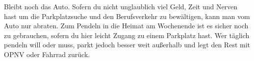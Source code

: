 
Bleibt noch das Auto. Sofern du nicht unglaublich viel Geld, Zeit und Nerven hast um die Parkplatzsuche und den Berufsverkehr zu bewältigen, kann man vom Auto nur abraten. Zum Pendeln in die Heimat am Wochenende ist es sicher noch zu gebrauchen, sofern du hier leicht Zugang zu einem Parkplatz hast. Wer täglich pendeln will oder muss, parkt jedoch besser weit außerhalb und legt den Rest mit OPNV oder Fahrrad zurück.
